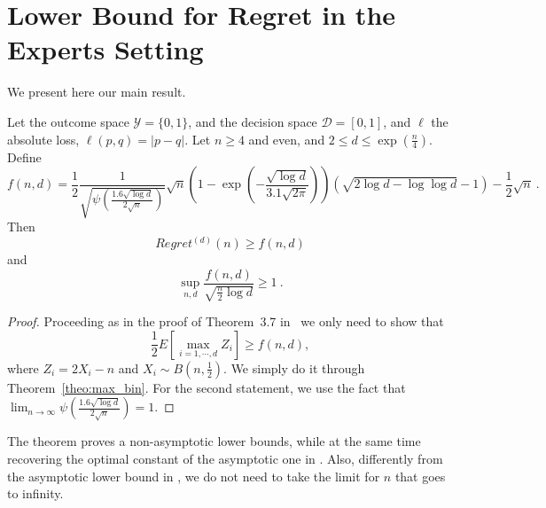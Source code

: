 \documentclass{article} %
\begin{document}
\section{Lower Bound for Regret in the Experts Setting}

We present here our main result.

\begin{theorem}
Let the outcome space $\mathcal{Y}=\{0,1\}$, and the decision space $\mathcal{D}=[0,1]$, and $\ell$ the absolute loss, $\ell(p,q)=|p-q|$. Let $n\geq4$ and even, and $2\leq d \leq \exp(\frac{n}{4})$.
Define
\[
f(n,d)=\frac{1}{2}\frac{1}{\sqrt{\psi\left(\frac{1.6 \sqrt{\log d}}{2 \sqrt{n}}\right)}}\sqrt{n}\left(1 - \exp\left(-\frac{\sqrt{\log d}}{3.1 \sqrt{2\pi}}\right)\right) \left(\sqrt{2 \log d -\log \log d}-1\right) -\frac{1}{2}\sqrt{n}~.
\]
Then
\[
Regret^{(d)}(n)\geq f(n,d)
\]
and
\[
\sup_{n,d} \frac{f(n,d)}{\sqrt{\frac{n}{2} \log d}} \geq 1~.
\]
\end{theorem}
%
\begin{proof}
Proceeding as in the proof of Theorem~3.7 in~\citep{Cesa-BianchiL06} we only need to show that
\[
\frac{1}{2} E\left[ \max_{i=1,\cdots,d} Z_i\right] \geq f(n,d),
\]
where $Z_i= 2 X_i - n$ and $X_i \sim B(n, \frac{1}{2})$. We simply do it through Theorem~\ref{theo:max_bin}.
For the second statement, we use the fact that $\lim_{n\rightarrow\infty} \psi\left(\frac{1.6 \sqrt{\log d}}{2 \sqrt{n}}\right) = 1$.
\end{proof}

The theorem proves a non-asymptotic lower bounds, while at the same time recovering the optimal constant of the asymptotic one in \citet{Cesa-BianchiL06}. Also, differently from the asymptotic lower bound in \citet{Cesa-BianchiL06}, we do not need to take the limit for $n$ that goes to infinity.




\appendix
\end{document}
